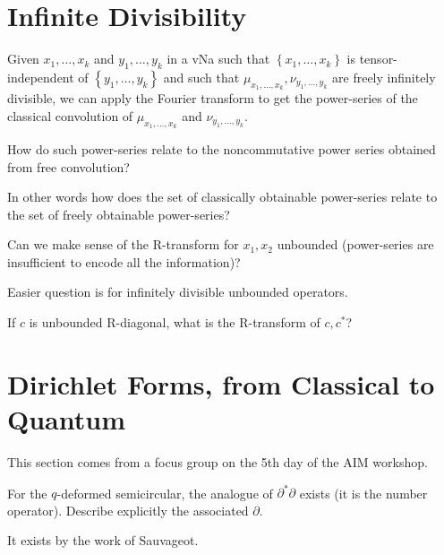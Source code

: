 \documentclass[12pt,letterpaper, reqno]{amsart}
\begin{document}
\section{Infinite Divisibility}

\begin{problemblock}
 Given $x_{1},\ldots,x_{k}$ and $y_{1},\ldots,y_{k}$
in a vNa such that $\left\{ x_{1},\ldots,x_{k}\right\} $ is tensor-independent
of $\left\{ y_{1},\ldots,y_{k}\right\} $ and such that $\mu_{x_{1},\ldots,x_{k}},\nu_{y_{1},\ldots,y_{k}}$
are freely infinitely divisible, we can apply the Fourier transform
to get the power-series of the classical convolution of $\mu_{x_{1},\ldots,x_{k}}$
and $\nu_{y_{1},\ldots,y_{k}}$.
\begin{problem}
How do such power-series relate to
the noncommutative power series obtained from free convolution?
\end{problem}
In
other words how does the set of classically obtainable power-series
relate to the set of freely obtainable power-series?
\end{problemblock}

\begin{problemblock}
\begin{problem}
 Can we make sense of the R-transform for $x_{1},x_{2}$
unbounded (power-series are insufficient to encode all the information)?\end{problem}
Easier question is for infinitely divisible unbounded operators.
\end{problemblock}

\begin{problem} If $c$ is unbounded R-diagonal, what is the
R-transform of $c,c^{*}$?
\end{problem}

\section{ Dirichlet Forms, from Classical to Quantum}
This section comes from a focus group on the 5th day of the AIM workshop.

\begin{problemblock}
\begin{problem}
 For the $q$-deformed semicircular, the analogue
of $\partial^{*}\partial$ exists (it is the number operator). 
     Describe explicitly the associated $\partial$.
\end{problem}
It exists by the work of Sauvageot.
\end{problemblock}
\end{document}
